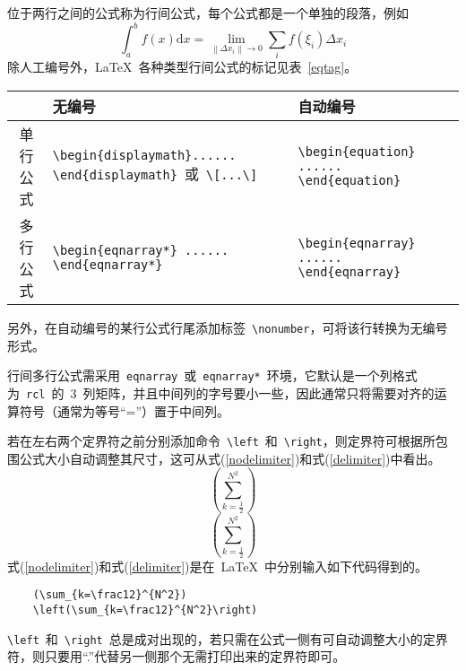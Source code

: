 	位于两行之间的公式称为行间公式，每个公式都是一个单独的段落，例如
	\[\int_a^b{f\left(x\right)\mathrm{d}x}=\lim_{\left\|\Delta{x_i}\right\|\to 0}\sum_i{f\left(\xi_i\right)\Delta{x_i}}\]
	除人工编号外，\LaTeX~各种类型行间公式的标记见表~\ref{eqtag}。
	\begin{table}[htbp]
		\vspace{0.5em}\centering\wuhao
		\begin{tabularx}{0.85\textwidth}{cXX}
			\toprule
			& 无编号 & 自动编号\\\midrule
			单行公式 & \verb|\begin{displaymath}...... \end{displaymath}|~或~\verb|\[...\]| & \verb|\begin{equation} ...... \end{equation}|\\
			多行公式 & \verb|\begin{eqnarray*} ...... \end{eqnarray*}| & \verb|\begin{eqnarray} ...... \end{eqnarray}|\\
			\bottomrule
		\end{tabularx}
	\end{table}
	另外，在自动编号的某行公式行尾添加标签~\verb|\nonumber|，可将该行转换为无编号形式。
	
	行间多行公式需采用~\verb|eqnarray|~或~\verb|eqnarray*|~环境，它默认是一个列格式为~\verb|rcl|~的~3~列矩阵，并且中间列的字号要小一些，因此通常只将需要对齐的运算符号（通常为等号“=”）置于中间列。
	
	若在左右两个定界符之前分别添加命令~\verb|\left|~和~\verb|\right|，则定界符可根据所包围公式大小自动调整其尺寸，这可从式(\ref{nodelimiter})和式(\ref{delimiter})中看出。
	\begin{equation}\label{nodelimiter}
	(\sum_{k=\frac12}^{N^2})
	\end{equation}
	\begin{equation}\label{delimiter}
	\left(\sum_{k=\frac12}^{N^2}\right)
	\end{equation}
	式(\ref{nodelimiter})和式(\ref{delimiter})是在~\LaTeX~中分别输入如下代码得到的。
	\begin{verbatim}
	(\sum_{k=\frac12}^{N^2})
	\left(\sum_{k=\frac12}^{N^2}\right)
	\end{verbatim}
	\verb|\left|~和~\verb|\right|~总是成对出现的，若只需在公式一侧有可自动调整大小的定界符，则只要用“.”代替另一侧那个无需打印出来的定界符即可。
	
